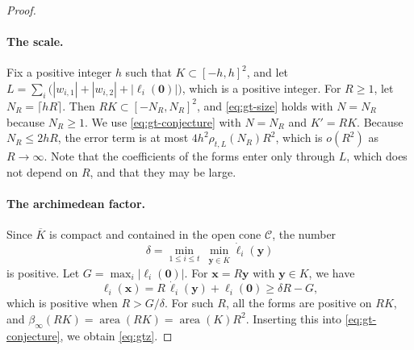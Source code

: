 \documentclass[12pt,oneside,openany]{book}
\theoremstyle{definition}
\theoremstyle{plain}
\numberwithin{equation}{chapter}
\theoremstyle{plain}
\theoremstyle{definition}
\theoremstyle{remark}
\DeclareMathOperator{\area}{area}
\begin{document}
\begin{proof}
\paragraph{The scale.} Fix a positive integer $h$ such that $K\subset[-h,h]^2$, and let $L=\sum_{i}\big(|w_{i,1}|+|w_{i,2}|+|\ell_i(\mathbf 0)|\big)$, which is a positive integer. For $R\ge1$, let $N_R=\lceil hR\rceil$. Then $RK\subset[-N_R,N_R]^2$, and \eqref{eq:gt-size} holds with $N=N_R$ because $N_R\ge1$. We use \eqref{eq:gt-conjecture} with $N=N_R$ and $K'=RK$. Because $N_R\le2hR$, the error term is at most $4h^2\rho_{t,L}(N_R)R^2$, which is $o(R^2)$ as $R\to\infty$. Note that the coefficients of the forms enter only through $L$, which does not depend on $R$, and that they may be large.

\paragraph{The archimedean factor.} Since $\overline K$ is compact and contained in the open cone $\mathcal C$, the number
\[
\delta=\min_{1\le i\le t}\ \min_{\mathbf y\in\overline K}\dot\ell_i(\mathbf y)
\]
is positive. Let $G=\max_i|\ell_i(\mathbf 0)|$. For $\mathbf x=R\mathbf y$ with $\mathbf y\in K$, we have
\begin{equation}\label{eq:gtz-positive}
\ell_i(\mathbf x)=R\,\dot\ell_i(\mathbf y)+\ell_i(\mathbf 0)\ge\delta R-G,
\end{equation}
which is positive when $R>G/\delta$. For such $R$, all the forms are positive on $RK$, and $\beta_\infty(RK)=\area(RK)=\area(K)R^2$. Inserting this into \eqref{eq:gt-conjecture}, we obtain \eqref{eq:gtz}.


\end{proof}
\end{document}
